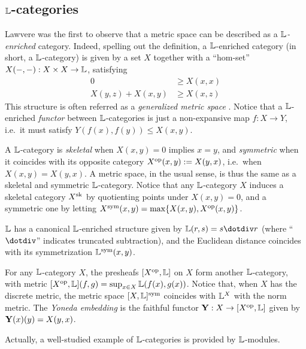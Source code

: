 \subsection{$\mathbb{L}$-categories}

Lawvere was the first to observe that a metric space can be described as a \emph{$\mathbb{L}$-enriched} category. Indeed, spelling out the definition, a $\mathbb{L}$-enriched category (in short, a $\mathbb{L}$-category) is given by a set $X$ together with a ``hom-set'' $X(-,-):X\times X\to \mathbb{L}$, satisfying 
\begin{align}
0  & \geq X(x,x) \tag{$\Lawv$-cat 1}\\
X(y,z)+X(x,y)&\geq  X(x,z) \tag{$\Lawv$-cat 2}
\end{align}
This structure is often referred as a \emph{generalized metric space} \cite{Lawvere1973, Hofmann2014, Stubbe2014}.%
Notice that a $\mathbb{L}$-enriched \emph{functor} between $\mathbb{L}$-categories is just a non-expansive map $f:X\to Y$, i.e.~it must satisfy $Y(f(x),f(y))\leq X(x,y)$.

A $\mathbb{L}$-category is \emph{skeletal} \cite{Stubbe2014} when 
$X(x,y)=0$ implies $x=y$, and 
 \emph{symmetric} when it coincides with its opposite category $X^{\mathrm{op}}(x,y):=X(y,x)$, i.e.~when $X(x,y)=X(y,x)$. 
 A metric space, in the usual sense, is thus the same as a skeletal and symmetric $\mathbb{L}$-category.
  Notice that any $\mathbb{L}$-category $X$ induces a skeletal category $X^{\mathrm{sk}}$ by quotienting points under $X(x,y)=0$, and a symmetric one by letting $X^{\mathrm{sym}}(x,y)=\max\{X(x,y),X^{\mathrm{op}}(x,y)\}$.
 
 $\mathbb{L}$ has a canonical $\mathbb{L}$-enriched structure given by 
 $\Lawv(r,s)=s \menus r$ (where ``$\dotdiv$'' indicates truncated subtraction), and the Euclidean distance coincides with its symmetrization $\mathbb{L}^{\mathrm{sym}}(x,y)$.
 
 
 
 
 

For any $\mathbb{L}$-category $X$, the presheafs $[X^{\mathrm{op}},\mathbb{L}]$ on $X$ form another $\mathbb{L}$-category, with metric $[X^{\mathrm{op}},\mathbb{L}](f,g)= \sup_{x\in X}\mathbb{L}(f(x),g(x))$.
Notice that, when $X$ has the discrete metric, the metric space $[X,\mathbb{L}]^{\mathrm{sym}}$ coincides with $\mathbb{L}^{X}$ with the norm metric.
The \emph{Yoneda embedding} is the faithful functor $\mathbf{Y}: X\to [X^{\mathrm{op}},\mathbb{L}]$ given by $\mathbf{Y}(x)(y)=X(y,x)$.



Actually, a well-studied example of $\mathbb{L}$-categories is provided by $\mathbb{L}$-modules. 

